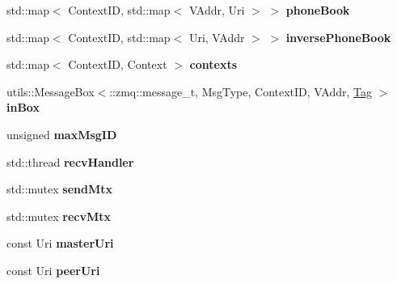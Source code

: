 \begin{DoxyCompactItemize}
\item 
\hypertarget{structgraybat_1_1communicationPolicy_1_1ZMQ_aacf828766b08157f9e13172949bc447b}{}std\+::map$<$ Context\+I\+D, std\+::map$<$ V\+Addr, Uri $>$ $>$ {\bfseries phone\+Book}\label{structgraybat_1_1communicationPolicy_1_1ZMQ_aacf828766b08157f9e13172949bc447b}

\item 
\hypertarget{structgraybat_1_1communicationPolicy_1_1ZMQ_a3c28dcbf8c7e5af3b282a3116130ade0}{}std\+::map$<$ Context\+I\+D, std\+::map$<$ Uri, V\+Addr $>$ $>$ {\bfseries inverse\+Phone\+Book}\label{structgraybat_1_1communicationPolicy_1_1ZMQ_a3c28dcbf8c7e5af3b282a3116130ade0}

\item 
\hypertarget{structgraybat_1_1communicationPolicy_1_1ZMQ_ab24f971152ddf296cf9e37a84f72ba43}{}std\+::map$<$ Context\+I\+D, Context $>$ {\bfseries contexts}\label{structgraybat_1_1communicationPolicy_1_1ZMQ_ab24f971152ddf296cf9e37a84f72ba43}

\item 
\hypertarget{structgraybat_1_1communicationPolicy_1_1ZMQ_a048cd99c3b30b8269695800aeec8b6b5}{}utils\+::\+Message\+Box$<$\+::zmq\+::message\+\_\+t, Msg\+Type, Context\+I\+D, V\+Addr, \hyperlink{structTag}{Tag} $>$ {\bfseries in\+Box}\label{structgraybat_1_1communicationPolicy_1_1ZMQ_a048cd99c3b30b8269695800aeec8b6b5}

\item 
\hypertarget{structgraybat_1_1communicationPolicy_1_1ZMQ_a5d8937267cb65df0d1954304eb60c060}{}unsigned {\bfseries max\+Msg\+I\+D}\label{structgraybat_1_1communicationPolicy_1_1ZMQ_a5d8937267cb65df0d1954304eb60c060}

\item 
\hypertarget{structgraybat_1_1communicationPolicy_1_1ZMQ_a0a46bd55b77c5d1638ee45779f591251}{}std\+::thread {\bfseries recv\+Handler}\label{structgraybat_1_1communicationPolicy_1_1ZMQ_a0a46bd55b77c5d1638ee45779f591251}

\item 
\hypertarget{structgraybat_1_1communicationPolicy_1_1ZMQ_a6330356fc4e18a28f820ad0d1ffd9b6c}{}std\+::mutex {\bfseries send\+Mtx}\label{structgraybat_1_1communicationPolicy_1_1ZMQ_a6330356fc4e18a28f820ad0d1ffd9b6c}

\item 
\hypertarget{structgraybat_1_1communicationPolicy_1_1ZMQ_ae962deaa23647ec055cdcb7ca91c5da6}{}std\+::mutex {\bfseries recv\+Mtx}\label{structgraybat_1_1communicationPolicy_1_1ZMQ_ae962deaa23647ec055cdcb7ca91c5da6}

\item 
\hypertarget{structgraybat_1_1communicationPolicy_1_1ZMQ_aeeeee6bb1e189218a66f53d442cc0726}{}const Uri {\bfseries master\+Uri}\label{structgraybat_1_1communicationPolicy_1_1ZMQ_aeeeee6bb1e189218a66f53d442cc0726}

\item 
\hypertarget{structgraybat_1_1communicationPolicy_1_1ZMQ_a0f4be8b5db76294a90adc532672f86a8}{}const Uri {\bfseries peer\+Uri}\label{structgraybat_1_1communicationPolicy_1_1ZMQ_a0f4be8b5db76294a90adc532672f86a8}

\end{DoxyCompactItemize}
